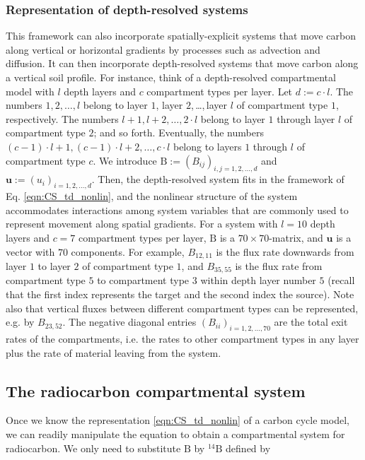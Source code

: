 \documentclass[11pt,a4paper]{article}
\renewcommand{\vec}[1]{\mathbf{#1}}
\newcommand{\tens}[1]{\mathrm{#1}}
\begin{document}
    \subsubsection*{Representation of depth-resolved systems}
    This framework can also incorporate spatially-explicit systems that move carbon along vertical or horizontal gradients by processes such as advection and diffusion. It can then incorporate depth-resolved systems that move carbon along a vertical soil profile.
    For instance, think of a depth-resolved compartmental model with $l$ depth layers and $c$ compartment types per layer.
    Let $d:=c \cdot l$.
    The numbers $1,2,\ldots,l$ belong to layer $1$, layer $2$,\,\ldots,\,layer $l$ of compartment type $1$, respectively.
    The numbers $l+1,l+2,\ldots,2 \cdot l$ belong to layer $1$ through layer $l$ of compartment type $2$; and so forth.
    Eventually, the numbers $(c-1) \cdot l+1,(c-1) \cdot l+2,\ldots,c \cdot l$ belong to layers $1$ through $l$ of compartment type $c$.
    We introduce $\tens{B}:=(B_{ij})_{i,j=1,2,\ldots,d}$ and $\vec{u}:=(u_i)_{i=1,2,\ldots,d}$.
    Then, the depth-resolved system fits in the framework of Eq. \eqref{eqn:CS_td_nonlin}, and the nonlinear structure of the system accommodates  interactions among system variables that are commonly used to represent movement along spatial gradients.
    For a system with $l=10$ depth layers and $c=7$ compartment types per layer, $\tens{B}$ is a $70\times 70$-matrix, and $\vec{u}$ is a vector with $70$ components.
    For example, $B_{12,11}$ is the flux rate downwards from layer $1$ to layer $2$ of compartment type $1$, and $B_{35,55}$ is the flux rate from compartment type $5$ to compartment type $3$ within depth layer number $5$ (recall that the first index represents the target and the second index the source).
    Note  also that vertical fluxes between different compartment types can be represented, e.g. by $B_{23,52}$.
    The negative diagonal entries $(B_{ii})_{i=1,2,\ldots,70}$ are the total exit rates of the compartments, i.e. the rates to other compartment types in any layer plus the rate of material leaving from the system.
    

\subsection{The radiocarbon compartmental system}
    Once we know the representation \eqref{eqn:CS_td_nonlin} of a carbon cycle model, we can readily manipulate the equation to obtain a compartmental system for radiocarbon.
    We only need to substitute $\tens{B}$ by ${}^{14}\tens{B}$ defined by
    
\end{document}
